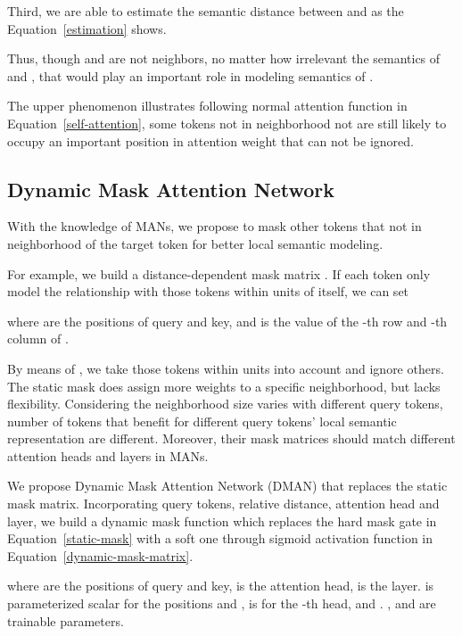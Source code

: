 \documentclass[11pt]{article}
\begin{document}
Third, we are able to estimate the semantic distance between  and  as the Equation~\ref{estimation} shows.

Thus, though  and  are not neighbors, no matter how irrelevant the semantics of  and ,  that  would play an important role in modeling semantics of . 



The upper phenomenon illustrates following normal attention function in Equation~\ref{self-attention}, some tokens not in neighborhood not are still likely to occupy an important position in attention weight that can not be ignored. 

\subsection{Dynamic Mask Attention Network}
\label{dynamic-mask-self-attention-network}








With the knowledge of MANs, we propose to mask other tokens that not in neighborhood of the target token for better local semantic modeling.  



For example, we build a distance-dependent mask matrix . If each token only model the relationship with those tokens within  units of itself, we can set 

where  are the positions of query and key, and  is the value of the -th row and -th column of  . 

By means of , we take those tokens within  units into account and ignore others. The static mask does assign more weights to a specific neighborhood, but lacks flexibility. Considering the neighborhood size varies with different query tokens, number of tokens that benefit for different query tokens' local semantic representation are different. Moreover, their mask matrices should match different attention heads and layers in MANs.

We propose Dynamic Mask Attention Network (DMAN) that replaces the static mask matrix. Incorporating query tokens, relative distance, attention head and layer, we build a dynamic mask function which replaces the hard  mask gate in Equation~\ref{static-mask} with a soft one through sigmoid activation function in Equation~\ref{dynamic-mask-matrix}.

where  are the positions of query and key,  is the attention head,  is the layer.  is parameterized scalar for the positions  and ,  is for the -th head, and . ,  and  are trainable parameters.
\end{document}
